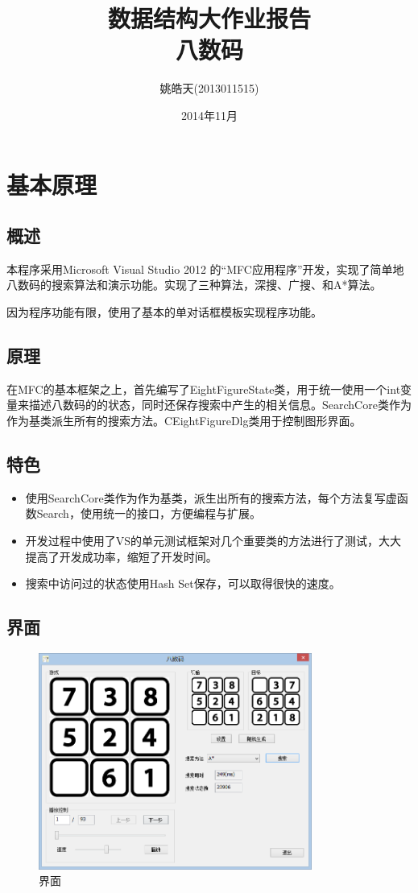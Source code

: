 \documentclass[12pt,a4paper]{article}
\author{姚皓天(2013011515)}
\title{数据结构大作业报告\\八数码}
\date{2014年11月}
\begin{document}
\maketitle
\thispagestyle{empty}

\newpage
\thispagestyle{empty}
\renewcommand\contentsname{\textbf{目录}}
\tableofcontents

\newpage
\section{基本原理}
\subsection{概述}
本程序采用Microsoft Visual Studio 2012 的“MFC应用程序”开发，实现了简单地八数码的搜索算法和演示功能。实现了三种算法，深搜、广搜、和A*算法。

因为程序功能有限，使用了基本的单对话框模板实现程序功能。
\subsection{原理}
在MFC的基本框架之上，首先编写了EightFigureState类，用于统一使用一个int变量来描述八数码的的状态，同时还保存搜索中产生的相关信息。SearchCore类作为作为基类派生所有的搜索方法。CEightFigureDlg类用于控制图形界面。
\subsection{特色}
\begin{itemize}
\item 使用SearchCore类作为作为基类，派生出所有的搜索方法，每个方法复写虚函数Search，使用统一的接口，方便编程与扩展。
\item 开发过程中使用了VS的单元测试框架对几个重要类的方法进行了测试，大大提高了开发成功率，缩短了开发时间。
\item 搜索中访问过的状态使用Hash Set保存，可以取得很快的速度。
\end{itemize}
\subsection{界面}
\begin{figure}[H]
\centering
\includegraphics[width=0.8\textwidth]{1.png}
\caption{界面} 
\end{figure}
\end{document}
